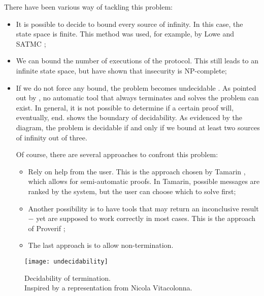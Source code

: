 There have been various way of tackling this problem:
\begin{itemize}
    \item{It is possible to decide to bound every source of infinity. In this case, the state space is finite. This method was used, for example, by Lowe \cite{LoweNeedhamSchroederPK} and SATMC \cite{SATMC};}

    \item{We can bound the number of executions of the protocol. This still leads to an infinite state space, but \cite{SymbolicModelNPCompleteInsecurity} have shown that insecurity is NP-complete;}
    
    \item{If we do not force any bound, the problem becomes undecidable \cite{SymbolicModelUndecidability1} \cite{SymbolicModelUndecidability2}. As pointed out by \cite{SymbolicVerificationBlanchet}, no automatic tool that always terminates and solves the problem can exist. In general, it is not possible to determine if a certain proof will, eventually, end.  shows the boundary of decidability. As evidenced by the diagram, the problem is decidable if and only if we bound at least two sources of infinity out of three.

    Of course, there are several approaches to confront this problem:

    \begin{itemize}
        \item{Rely on help from the user. This is the approach chosen by Tamarin \cite{TamarinFoundations}, which allows for semi-automatic proofs. In Tamarin, possible messages are ranked by the system, but the user can choose which to solve first;}
        \item{Another possibility is to have tools that may return an inconclusive result $-$ yet are supposed to work correctly in most cases. This is the approach of Proverif \cite{SymbolicVerificationBlanchet};}
        \item{The last approach is to allow non-termination.}
    \end{itemize}
    }
\end{itemize}


\begin{figure}[t]
    \texttt{[image: undecidability]}
    \centering
    \caption{Decidability of termination.\\Inspired by a representation from Nicola Vitacolonna.}
    \label{fig:undecidability}
\end{figure}